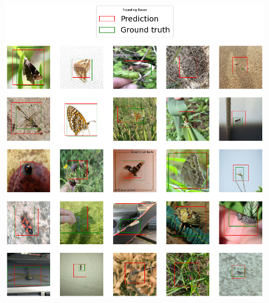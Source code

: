 \begin{figure}
\begin{multicols}{2}
\begin{minipage}{.45\textwidth}
        \end{minipage}
        \columnbreak
        \begin{minipage}{.45\textwidth}
            \includegraphics[width=\textwidth]{images/augmented-regression-mobilenet.png}
        \end{minipage}
    \end{multicols}
    \begin{multicols}{2}
        \begin{minipage}{.45\textwidth}

\end{minipage}
\end{multicols}
\end{figure}
